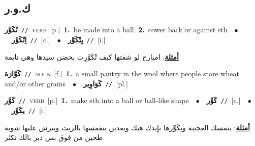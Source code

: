 \documentclass[10pt,a4paper,twoside]{article} %
\begin{document}
\begin{multicols}{2}
\vspace{-3mm}
\subsection*{\color{blue}\foreignlanguage{arabic}{ك.و.ر}\color{blue}{}} 

{\setlength\topsep{0pt}\textbf{\foreignlanguage{arabic}{تْكَوَّر}}\ {\color{gray}\texttt{//}\color{black}}\ \textsc{verb}\ [p.]\ \textbf{1.}~be made into a ball.  \textbf{2.}~cower back or against sth\ \ $\bullet$\ \ \setlength\topsep{0pt}\textbf{\foreignlanguage{arabic}{اِتْكَوَّر}}\ {\color{gray}\texttt{//}\color{black}}\ [c.]\ \ $\bullet$\ \ \setlength\topsep{0pt}\textbf{\foreignlanguage{arabic}{يِتْكَوَّر}}\ {\color{gray}\texttt{//}\color{black}}\ [i.]\  \begin{flushright}\color{gray}\foreignlanguage{arabic}{\textbf{\underline{\foreignlanguage{arabic}{أمثلة}}}: امبارح لو شفتها كيف تْكَوَّرِت بحضن سيدها وهي نايمة}\end{flushright}\color{black}} \vspace{2mm}

{\setlength\topsep{0pt}\textbf{\foreignlanguage{arabic}{كَوَّارَة}}\ {\color{gray}\texttt{//}\color{black}}\ \textsc{noun}\ [f.]\ \textbf{1.}~a small pantry in the wool where people store wheat and/or other grains\ \ $\bullet$\ \ \setlength\topsep{0pt}\textbf{\foreignlanguage{arabic}{كَوَاوِير}}\ {\color{gray}\texttt{//}\color{black}}\ [pl.]\ } \vspace{2mm}

{\setlength\topsep{0pt}\textbf{\foreignlanguage{arabic}{كَوَّر}}\ {\color{gray}\texttt{//}\color{black}}\ \textsc{verb}\ [p.]\ \textbf{1.}~make sth into a ball or ball-like shape\ \ $\bullet$\ \ \setlength\topsep{0pt}\textbf{\foreignlanguage{arabic}{كَوِّر}}\ {\color{gray}\texttt{//}\color{black}}\ [c.]\ \ $\bullet$\ \ \setlength\topsep{0pt}\textbf{\foreignlanguage{arabic}{يكَوِّر}}\ {\color{gray}\texttt{//}\color{black}}\ [i.]\  \begin{flushright}\color{gray}\foreignlanguage{arabic}{\textbf{\underline{\foreignlanguage{arabic}{أمثلة}}}: بتمسك العجينة وبِكَوِّرها بإِيدك هيك وبعدين بتغمسها بالزيت وبترش عليها شوية طحين من فوق بس دير بالك تكثر}\end{flushright}\color{black}} \vspace{2mm}


\end{multicols}
\end{document}
